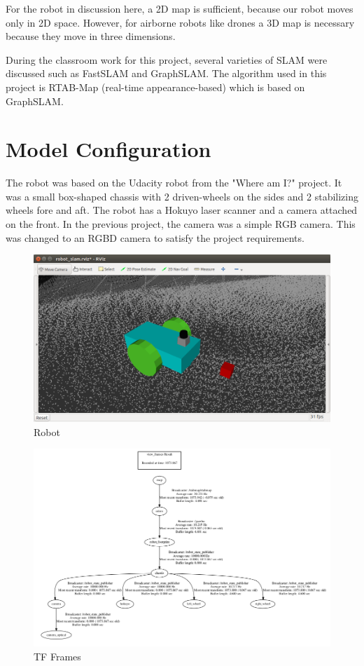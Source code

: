 \documentclass[10pt,journal,compsoc]{IEEEtran}
\begin{document}
For the robot in discussion here, a 2D map is sufficient, because our robot moves only in 2D space. However, for airborne robots like drones a 3D map is necessary because they move in three dimensions.

During the classroom work for this project, several varieties of SLAM were discussed such as FastSLAM and GraphSLAM. The algorithm used in this project is RTAB-Map (real-time appearance-based) which is based on GraphSLAM.

\section{Model Configuration}
The robot was based on the Udacity robot from the "Where am I?" project. It was a small box-shaped chassis with 2 driven-wheels on the sides and 2 stabilizing wheels fore and aft. The robot has a Hokuyo laser scanner and a camera attached on the front. In the previous project, the camera was a simple RGB camera. This was changed to an RGBD camera to satisfy the project requirements.

\begin{figure}[thpb]
    \centering
    \includegraphics[width=\linewidth]{robot}
    \caption{Robot}
    \label{fig:robot}
\end{figure}

\begin{figure}[thpb]
    \centering
    \includegraphics[width=\linewidth]{frames}
    \caption{TF Frames}
    \label{fig:frames}
\end{figure}
\end{document}

